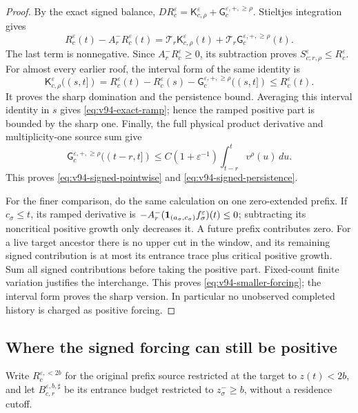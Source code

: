 \begin{proof}
By the exact signed balance,
$D R_c^\varepsilon=\mathsf K_{c,\rho}^\varepsilon+
\mathsf G_c^{\varepsilon,+,\ge\rho}$. Stieltjes integration gives
\begin{equation}\label{eq:v94-exact-ramp}
 R_c^\varepsilon(t)-A_r^-R_c^\varepsilon(t)
   =\mathcal T_r\mathsf K_{c,\rho}^\varepsilon(t)
       +\mathcal T_r\mathsf G_c^{\varepsilon,+,\ge\rho}(t).
\end{equation}
The last term is nonnegative. Since $A_r^-R_c^\varepsilon\ge0$,
its subtraction proves $S_{c;r,\rho}^\varepsilon\le R_c^\varepsilon$.
For almost every earlier roof, the interval form of the same identity is
\[
 \mathsf K_{c,\rho}^\varepsilon((s,t])
 =R_c^\varepsilon(t)-R_c^\varepsilon(s)
       -\mathsf G_c^{\varepsilon,+,\ge\rho}((s,t])
 \le R_c^\varepsilon(t).
\]
It proves the sharp domination and the persistence bound. Averaging
this interval identity in $s$ gives \eqref{eq:v94-exact-ramp}; hence
the ramped positive part is bounded by the sharp one. Finally, the
full physical product derivative and multiplicity-one source sum give
\[
 \mathsf G_c^{\varepsilon,+,\ge\rho}((t-r,t])
       \le C(1+\varepsilon^{-1})\int_{t-r}^t v^\rho(u)\,du.
\]
This proves \eqref{eq:v94-signed-pointwise} and
\eqref{eq:v94-signed-persistence}.

For the finer comparison, do the same calculation on one zero-extended
prefix. If $c_\sigma\le t$, its ramped derivative is
$-A_r^-(\mathbf1_{(a_\sigma,c_\sigma)}f_\sigma^\varepsilon)(t)\le0$;
subtracting its noncritical positive growth only decreases it.
A future prefix contributes zero. For a live target ancestor there
is no upper cut in the window, and its remaining signed contribution
is at most its entrance trace plus critical positive growth. Sum all
signed contributions before taking the positive part. Fixed-count
finite variation justifies the interchange. This proves
\eqref{eq:v94-smaller-forcing}; the interval form proves the sharp
version. In particular no unobserved completed history is charged as
positive forcing.
\end{proof}

\subsection{Where the signed forcing can still be positive}
Write $R_c^{\varepsilon,<2b}$ for the original prefix source restricted
at the target to $z(t)<2b$, and let $B_{c,r}^{\varepsilon,b,\sharp}$
be its entrance budget restricted to $z_\sigma^-\ge b$, without a
residence cutoff.

